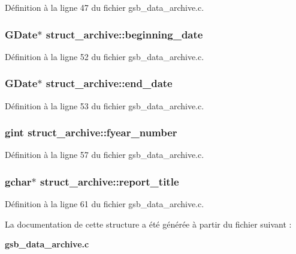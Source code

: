 Définition à la ligne 47 du fichier gsb\_\-data\_\-archive.c.

\subsubsection[{beginning\_\-date}]{\setlength{\rightskip}{0pt plus 5cm}GDate$\ast$ {\bf struct\_\-archive::beginning\_\-date}}\label{structstruct__archive_a1cf54868bc8c9392b31f11cb983106e5}


Définition à la ligne 52 du fichier gsb\_\-data\_\-archive.c.

\subsubsection[{end\_\-date}]{\setlength{\rightskip}{0pt plus 5cm}GDate$\ast$ {\bf struct\_\-archive::end\_\-date}}\label{structstruct__archive_a586eb641da246bd96073110e68011ea6}


Définition à la ligne 53 du fichier gsb\_\-data\_\-archive.c.

\subsubsection[{fyear\_\-number}]{\setlength{\rightskip}{0pt plus 5cm}gint {\bf struct\_\-archive::fyear\_\-number}}\label{structstruct__archive_a7359892c534c9bb420fe45165649c88d}


Définition à la ligne 57 du fichier gsb\_\-data\_\-archive.c.

\subsubsection[{report\_\-title}]{\setlength{\rightskip}{0pt plus 5cm}gchar$\ast$ {\bf struct\_\-archive::report\_\-title}}\label{structstruct__archive_a3c85b3b7da31edcef639906a0ff3b77a}


Définition à la ligne 61 du fichier gsb\_\-data\_\-archive.c.



La documentation de cette structure a été générée à partir du fichier suivant :\begin{DoxyCompactItemize}
\item 
{\bf gsb\_\-data\_\-archive.c}\end{DoxyCompactItemize}
